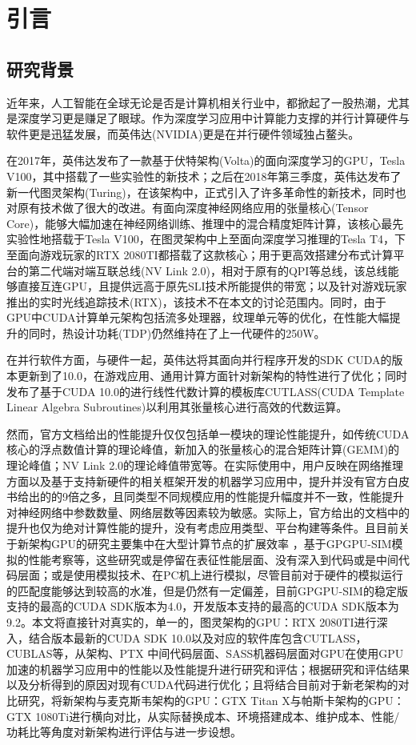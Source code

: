 \newpage
\section{引言}
\setcounter{table}{0}
\setcounter{figure}{0}
\subsection{研究背景}
\par 近年来，人工智能在全球无论是否是计算机相关行业中，都掀起了一股热潮，尤其是深度学习更是赚足了眼球。作为深度学习应用中计算能力支撑的并行计算硬件与软件更是迅猛发展，而英伟达(NVIDIA)更是在并行硬件领域独占鳌头。
\par 在2017年，英伟达发布了一款基于伏特架构(Volta)的面向深度学习的GPU，Tesla V100\cite{TESLAV100}，其中搭载了一些实验性的新技术；之后在2018年第三季度，英伟达发布了新一代图灵架构(Turing)，在该架构中，正式引入了许多革命性的新技术，同时也对原有技术做了很大的改进。有面向深度神经网络应用的张量核心(Tensor Core)\cite{TENSORCORE}，能够大幅加速在神经网络训练、推理中的混合精度矩阵计算，该核心最先实验性地搭载于Tesla V100，在图灵架构中上至面向深度学习推理的Tesla T4，下至面向游戏玩家的RTX 2080TI都搭载了这款核心；用于更高效搭建分布式计算平台的第二代端对端互联总线(NV Link 2.0)\cite{NVLINK2}，相对于原有的QPI等总线，该总线能够直接互连GPU，且提供远高于原先SLI技术所能提供的带宽；以及针对游戏玩家推出的实时光线追踪技术(RTX)，该技术不在本文的讨论范围内。同时，由于GPU中CUDA计算单元架构包括流多处理器，纹理单元等的优化，在性能大幅提升的同时，热设计功耗(TDP)仍然维持在了上一代硬件的250W。
\par 在并行软件方面，与硬件一起，英伟达将其面向并行程序开发的SDK CUDA的版本更新到了10.0，在游戏应用、通用计算方面针对新架构的特性进行了优化；同时发布了基于CUDA 10.0的进行线性代数计算的模板库CUTLASS(CUDA Template Linear Algebra Subroutines)\cite{CUTLASS}以利用其张量核心进行高效的代数运算。
\par 然而，官方文档给出的性能提升仅仅包括单一模块的理论性能提升，如传统CUDA核心的浮点数值计算的理论峰值，新加入的张量核心的混合矩阵计算(GEMM)的理论峰值；NV Link 2.0的理论峰值带宽等。在实际使用中，用户反映在网络推理方面以及基于支持新硬件的相关框架开发的机器学习应用中，提升并没有官方白皮书给出的的9倍之多\cite{VOLTAWHITEPAPER}，且同类型不同规模应用的性能提升幅度并不一致，性能提升对神经网络中参数数量、网络层数等因素较为敏感。实际上，官方给出的文档中的提升也仅为绝对计算性能的提升，没有考虑应用类型、平台构建等条件。且目前关于新架构GPU的研究主要集中在大型计算节点的扩展效率 \cite{EXASCLEDL}，基于GPGPU-SIM模拟的性能考察等\cite{MODELING}，这些研究或是停留在表征性能层面、没有深入到代码或是中间代码层面；或是使用模拟技术、在PC机上进行模拟，尽管目前对于硬件的模拟运行的匹配度能够达到较高的水准，但是仍然有一定偏差，目前GPGPU-SIM的稳定版支持的最高的CUDA SDK版本为4.0，开发版本支持的最高的CUDA SDK版本为9.2。本文将直接针对真实的，单一的，图灵架构的GPU：RTX 2080TI进行深入，结合版本最新的CUDA SDK 10.0以及对应的软件库包含CUTLASS，CUBLAS等，从架构、PTX 中间代码层面、SASS机器码层面对GPU在使用GPU加速的机器学习应用中的性能以及性能提升进行研究和评估；根据研究和评估结果以及分析得到的原因对现有CUDA代码进行优化；且将结合目前对于新老架构的对比研究\cite{GRAVITATIONAL}，将新架构与麦克斯韦架构的GPU：GTX Titan X与帕斯卡架构的GPU：GTX 1080Ti进行横向对比，从实际替换成本、环境搭建成本、维护成本、性能/功耗比等角度对新架构进行评估与进一步设想。
